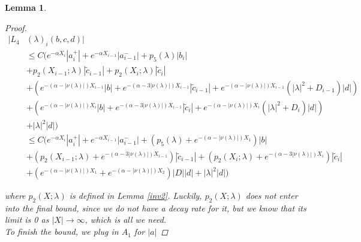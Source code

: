\documentclass[12pt]{article}
\newtheorem{lemma}{Lemma}
\begin{document}
\begin{lemma}
\begin{proof}
\begin{align*}
|L_4&(\lambda)_i(b, c, d)|\\
&\leq C \Big( e^{-\alpha X_i} |a_i^+| +  e^{-\alpha X_{i-1}} |a_{i-1}^-| + p_5(\lambda) |b_i| \\
&+ p_2(X_{i-1}; \lambda) |\tilde{c}_{i-1}| + p_2(X_i; \lambda) |\tilde{c}_i| \\
&+ ( e^{-(\alpha - |\nu(\lambda)|) X_{i-1}} |b| + e^{-(\alpha - 3 |\nu(\lambda)|) X_{i-1}}|\tilde{c}_{i-1}| + e^{-(\alpha - |\nu(\lambda)|) X_{i-1}} (|\lambda|^2 + D_{i-1})|d| ) \\
&+ ( e^{-(\alpha - |\nu(\lambda)|) X_i} |b| + e^{-(\alpha - 3 |\nu(\lambda)|) X_{i-1}}|\tilde{c}_i| + e^{-(\alpha - |\nu(\lambda)|) X_i} (|\lambda|^2 + D_i)|d| )  \\
&+ |\lambda|^2 |d| \Big)\\
&\leq C \Big( e^{-\alpha X_i} |a_i^+| +  e^{-\alpha X_{i-1}} |a_{i-1}^-| + (p_5(\lambda) + e^{-(\alpha - |\nu(\lambda)|) X_1}) |b| \\
&+ (p_2(X_{i-1}; \lambda) + e^{-(\alpha - 3 |\nu(\lambda)|) X_{i-1}}) |\tilde{c}_{i-1}| + (p_2(X_i; \lambda) + e^{-(\alpha - 3 |\nu(\lambda)|) X_i})|\tilde{c}_i| \\
&+ (e^{-(\alpha - |\nu(\lambda)|) X_1} + e^{-(\alpha - |\nu(\lambda)|) X_2})|D||d| + |\lambda|^2|d|
\Big)
\end{align*}

where $p_2(X; \lambda)$ is defined in Lemma \ref{inv2}. Luckily, $p_2(X; \lambda)$ does not enter into the final bound, since we do not have a decay rate for it, but we know that its limit is 0 as $|X| \rightarrow \infty$, which is all we need.\\

To finish the bound, we plug in $A_1$ for $|a|$


\end{proof}
\end{lemma}
\end{document}
